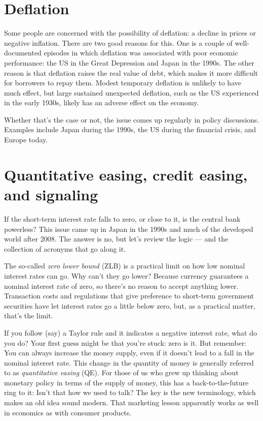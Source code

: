 \section{Deflation}

Some people are concerned with the possibility of deflation:
a decline in prices or negative inflation.
There are two good reasons for this.
One is a couple of well-documented episodes in which deflation was associated
with poor economic performance:
the US in the Great Depression and Japan in the 1990s.
The other reason is that deflation raises the real value of debt,
which makes it more difficult for borrowers to repay them.
Modest temporary deflation is unlikely to have much effect,
but large sustained unexpected deflation, such as the US experienced in the early 1930s,
likely has an adverse effect on the economy.

Whether that's the case or not, the issue comes up regularly in policy discussions.
Examples include Japan during the 1990s, the US during the financial crisis,
and Europe today.


\section{Quantitative easing, credit easing, and signaling}

If the short-term interest rate falls to zero, or close to it,
is the central bank  powerless?
This issue came up in Japan in the 1990s and
much of the developed world after 2008.
The answer is no, but let's review the logic --- and the collection of acronyms that go along it.

The so-called {\it zero lower bound\/} (ZLB) is a practical
limit on how low nominal interest rates can go.
Why can't they go lower?
Because currency guarantees a nominal interest rate of zero,
so there's no reason to accept anything lower.
Transaction costs and regulations that give preference
to short-term government securities have let interest rates
go a little below zero, but, as a practical matter, that's the limit.

If you follow (say) a Taylor rule and it indicates a negative interest rate,
what do you do?
Your first guess might be that you're stuck:  zero is it.
But remember:  You can always increase the money supply,
even if it doesn't lead to a fall in the nominal interest rate.
This change in the quantity of money is generally referred to as
{\it   quantitative easing \/} (QE).
For those of us who grew up thinking about monetary policy in
terms of the supply of money,
this has a back-to-the-future ring to it:
Isn't that how we used to talk?
The key is the new terminology,
which makes an old idea sound modern.
That marketing lesson apparently works as well in economics
as with consumer products.


